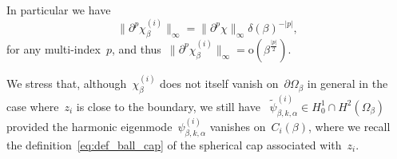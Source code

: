 \documentclass[10pt]{article}
\newcommand{\1}{\mathbbm 1}
\newcommand{\largeRadius}{\delta}
\renewcommand{\o}{\mathrm{o}}
\begin{document}
    In particular we have
    \begin{equation}
        \label{eq:linf_bound_nabla_chi}
        \|\partial^p\chi_\beta^{(i)}\|_\infty = \|\partial^p \chi\|_\infty \largeRadius(\beta)^{-|p|},
    \end{equation}
    for any multi-index~$p$, and thus~$\|\partial^p \chi_\beta^{(i)}\|_\infty = \o(\beta^{\frac{|p|}2})$.
    
    We stress that, although~$\chi_\beta^{(i)}$ does not itself vanish on~$\partial \Omega_\beta$ in general in the case where~$z_i$ is close to the boundary, we still have
   ~$\widetilde\psi_{\beta,k,\alpha}^{(i)}\in H_0^1\cap H^2(\Omega_\beta)$ provided the harmonic eigenmode~$\psi_{\beta,k,\alpha}^{(i)}$ vanishes on~$C_i(\beta)$, where we recall the definition~\eqref{eq:def_ball_cap} of the spherical cap associated with~$z_i$.
    
\end{document}
